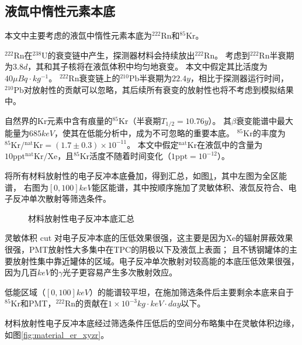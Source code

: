 \subsection{液氙中惰性元素本底}

本文中主要考虑的液氙中惰性元素本底为${}^{222}\mathrm{Rn}$和${}^{85}\mathrm{Kr}$。

${}^{222}\mathrm{Rn}$在${}^{238}\mathrm{U}$的衰变链中产生，探测器材料会持续放出${}^{222}\mathrm{Rn}$。
考虑到${}^{222}\mathrm{Rn}$半衰期为$3.8d$，其和其子核将在液氙体积中均匀地衰变\cite{the_xenon_collaboration_projected_2020}。
本文中假定其比活度为$40\mu\si{Bq\cdot kg^{-1}}$。
${}^{222}\mathrm{Rn}$衰变链上的${}^{210}\mathrm{Pb}$半衰期为$22.4y$，相比于探测器运行时间，
${}^{210}\mathrm{Pb}$对放射性的贡献可以忽略，其后续所有衰变的放射性也将不考虑到模拟结果中。

自然界的$\mathrm{Kr}$元素中含有痕量的${}^{85}\mathrm{Kr}$（半衰期$T_{1/2}=10.76y$）。
其$\beta$衰变能谱中最大能量为$685\si{keV}$，使其在低能分析中，成为不可忽略的重要本底。
${}^{85}\mathrm{Kr}$的丰度为${}^{85}\mathrm{Kr}/{}^\mathrm{nat}\mathrm{Kr}=(1.7\pm0.3)\times 10^{-11}$\cite{the_xenon_collaboration_projected_2020}。
本文中假定${}^\mathrm{nat}\mathrm{Kr}$在液氙中的含量为$10\mathrm{ppt}{}^\mathrm{nat}\mathrm{Kr}/\mathrm{Xe}$，且${}^{85}\mathrm{Kr}$活度不随着时间变化（$1\mathrm{ppt}=10^{-12}$）。

将所有材料放射性的电子反冲本底叠加，得到汇总，如图\ref{fig:material_er}，其中左图为全区能谱，
右图为$[0, 100]\si{keV}$能区能谱，其中按顺序施加了灵敏体积、液氙反符合、电子反冲单次散射等筛选条件。

\begin{figure}
  \centering
  
  \caption{\label{fig:material_er} 材料放射性电子反冲本底汇总}
\end{figure}

灵敏体积 cut 对电子反冲本底的压低效果很强，这主要是因为$\mathrm{Xe}$的辐射屏蔽效果很强，PMT放射性大多集中在TPC的阴极以下及液氙上表面；
且不锈钢罐体的主要放射性集中靠近罐体的区域。电子反冲单次散射对较高能的本底压低效果很强，因为几百$\si{keV}$的$\gamma$光子更容易产生多次散射效应。

低能区域（$[0, 100]\si{keV}$）的能谱较平坦，在施加筛选条件后主要剩余本底来自于${}^{85}\mathrm{Kr}$和PMT，${}^{222}\mathrm{Rn}$的贡献在$1\times10^{-3}\si{kg}\cdot\si{keV}\cdot\si{day}$以下。

材料放射性电子反冲本底经过筛选条件压低后的空间分布略集中在灵敏体积边缘，如图\ref{fig:material_er_xyzr}。

